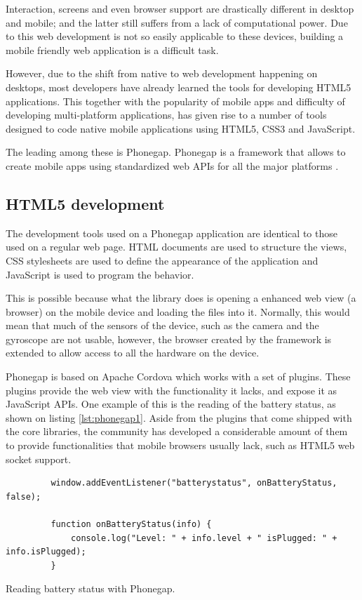Interaction, screens and even browser support are drastically different in desktop and mobile; and the latter still suffers from a lack of computational power. Due to this web development is not so easily applicable to these devices, building a mobile friendly web application is a difficult task.

However, due to the shift from native to web development happening on desktops, most developers have already learned the tools for developing HTML5 applications. This together with the popularity of mobile apps and difficulty of developing multi-platform applications, has given rise to a number of tools designed to code native mobile applications using HTML5, CSS3 and JavaScript.

The leading among these is Phonegap. Phonegap is a framework that allows to create mobile apps using standardized web APIs for all the major platforms \cite{phonegap}. 

\subsection*{HTML5 development}

The development tools used on a Phonegap application are identical to those used on a regular web page. HTML documents are used to structure the views, CSS stylesheets are used to define the appearance of the application and JavaScript is used to program the behavior.

This is possible because what the library does is opening a enhanced web view (a browser) on the mobile device and loading the files into it. Normally, this would mean that much of the sensors of the device, such as the camera and the gyroscope are not usable, however, the browser created by the framework is extended to allow access to all the hardware on the device.

Phonegap is based on Apache Cordova \cite{apachecordova} which works with a set of plugins. These plugins provide the web view with the functionality it lacks, and expose it as JavaScript APIs. One example of this is the reading of the battery status, as shown on listing \ref{lst:phonegap1}. Aside from the plugins that come shipped with the core libraries, the community has developed a considerable amount of them to provide functionalities that mobile browsers usually lack, such as HTML5 web socket support.

\begin{listing}[ht]\centering
  \begin{minipage}{.8\textwidth}
    \begin{verbatim}
	     window.addEventListener("batterystatus", onBatteryStatus, false);
	     
	     function onBatteryStatus(info) {
	         console.log("Level: " + info.level + " isPlugged: " + info.isPlugged);
	     }
    \end{verbatim}
  \end{minipage}
  \caption{Reading battery status with Phonegap.}\label{lst:phonegap1}
\end{listing}

